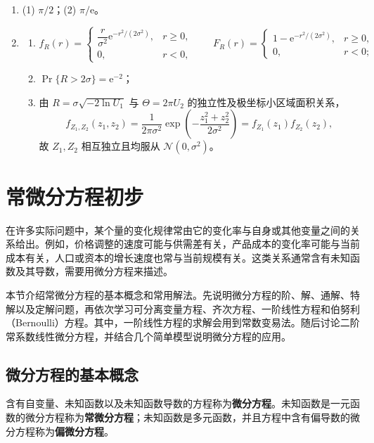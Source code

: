 \documentclass[fontset=fandol]{ctexart}
\newcommand{\ee}{\mathrm{e}}
\begin{document}
\begin{enumerate}
\item[1.] (1) $\pi/2$；(2) $\pi/\ee$。
\item[2.]
\begin{enumerate}
\item[(1)]
\[
f_R(r)=
\begin{cases}
\dfrac{r}{\sigma^2}\ee^{-r^2/(2\sigma^2)},&r\geq0,\\
0,&r<0,
\end{cases}
\qquad
F_R(r)=
\begin{cases}
1-\ee^{-r^2/(2\sigma^2)},&r\geq0,\\
0,&r<0;
\end{cases}
\]
\item[(2)] $\Pr\{R>2\sigma\}=\ee^{-2}$；
\item[(3)] 由 $R=\sigma\sqrt{-2\ln U_1}$ 与 $\Theta=2\pi U_2$ 的独立性及极坐标小区域面积关系，
\[
f_{Z_1,Z_2}(z_1,z_2)
=\frac1{2\pi\sigma^2}
\exp\left(-\frac{z_1^2+z_2^2}{2\sigma^2}\right)
=f_{Z_1}(z_1)f_{Z_2}(z_2),
\]
故 $Z_1,Z_2$ 相互独立且均服从 $\mathcal N(0,\sigma^2)$。
\end{enumerate}
\end{enumerate}

\fi


\clearpage
\section{常微分方程初步}

在许多实际问题中，某个量的变化规律常由它的变化率与自身或其他变量之间的关系给出。例如，价格调整的速度可能与供需差有关，产品成本的变化率可能与当前成本有关，人口或资本的增长速度也常与当前规模有关。这类关系通常含有未知函数及其导数，需要用微分方程来描述。

本节介绍常微分方程的基本概念和常用解法。先说明微分方程的阶、解、通解、特解以及定解问题，再依次学习可分离变量方程、齐次方程、一阶线性方程和伯努利（Bernoulli）方程。其中，一阶线性方程的求解会用到常数变易法。随后讨论二阶常系数线性微分方程，并结合几个简单模型说明微分方程的应用。

\subsection{微分方程的基本概念}

\begin{definition}[微分方程]
含有自变量、未知函数以及未知函数导数的方程称为\textbf{微分方程}。未知函数是一元函数的微分方程称为\textbf{常微分方程}；未知函数是多元函数，并且方程中含有偏导数的微分方程称为\textbf{偏微分方程}。
\end{definition}
\end{document}
